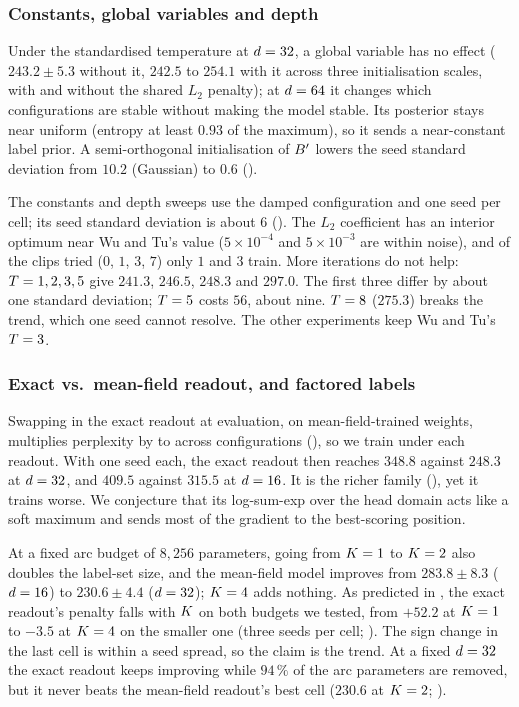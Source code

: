 \subsubsection{Constants, global variables and depth}
\label{sec:exp-knobs}
\label{sec:exp-depth}
\label{sec:exp-ablations}
Under the standardised temperature at $d=32$, a global variable has no effect ($243.2\pm5.3$
without it, $242.5$ to $254.1$ with it across three initialisation scales, with and without the
shared $L_2$ penalty); at $d=64$ it changes which configurations are stable without making
the model stable. Its posterior stays near uniform (entropy at least $0.93$ of the maximum), so
it sends a near-constant label prior. A semi-orthogonal initialisation of $B'$ lowers the
seed standard deviation from $10.2$ (Gaussian) to $0.6$ ().

The constants and depth sweeps use the damped configuration and one seed per cell; its seed
standard deviation is about $6$ (). The $L_2$ coefficient has an interior optimum near Wu and
Tu's value ($5\times10^{-4}$ and $5\times10^{-3}$ are within noise), and of the clips tried ($0$,
$1$, $3$, $7$) only $1$ and $3$ train. More iterations do not help: $T=1,2,3,5$ give
$241.3$, $246.5$, $248.3$ and $297.0$. The first three differ by about one standard deviation;
$T=5$ costs $56$, about nine. $T=8$ ($275.3$) breaks the trend, which one seed cannot
resolve. The other experiments keep Wu and Tu's $T=3$.

\subsubsection{Exact vs.\ mean-field readout, and factored labels}
\label{sec:exp3}
\label{sec:exp-factored}
Swapping in the exact readout at evaluation, on mean-field-trained weights, multiplies
perplexity by \SwapMildestRatio{} to \SwapWorstRatio{} across \SwapNconfigs{} configurations
(), so we train under each readout. With one seed each, the exact readout
then reaches $348.8$ against $248.3$ at $d=32$, and $409.5$ against $315.5$ at $d=16$.
It is the richer family (), yet it trains worse. We conjecture that its
log-sum-exp over the head domain acts like a soft maximum and sends most of the gradient to the
best-scoring position.

At a fixed arc budget of $8{,}256$ parameters, going from $K=1$ to $K=2$ also doubles
the label-set size, and the mean-field model improves from $283.8\pm8.3$ ($d=16$) to
$230.6\pm4.4$ ($d=32$); $K=4$ adds nothing. As predicted in , the
exact readout's penalty falls with $K$ on both budgets we tested, from $+52.2$ at $K=1$
to $-3.5$ at $K=4$ on the smaller one (three seeds per cell; ). The sign
change in the last cell is within a seed spread, so the claim is the trend. At a fixed
$d=32$ the exact readout keeps improving while $94\,\%$ of the arc parameters are removed,
but it never beats the mean-field readout's best cell ($230.6$ at $K=2$;
).

